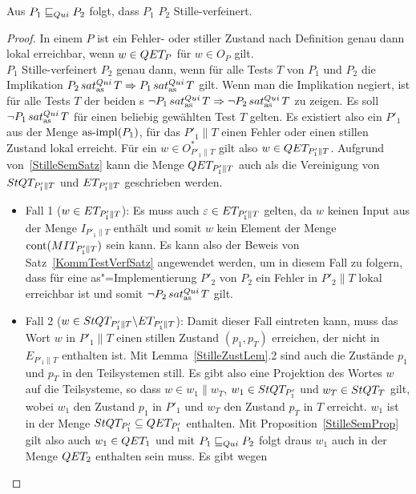 \begin{Satz}
  \label{StilleTestVerfSatz}
  Aus $P_1 \sqsubseteq  _{Qui} P_2$ folgt, dass $P_1$ $P_2$ Stille-verfeinert.
\end{Satz}
\begin{proof}
  In einem \MEIO{} $P$ ist ein Fehler- oder stiller Zustand nach Definition
  genau dann lokal erreichbar, wenn $w\in QET _P$ für $w\in O_P$ gilt.\\
  $P_1$ Stille-verfeinert $P_2$ genau dann, wenn für alle Tests $T$ von $P_1$
  und $P_2$ die Implikation $P_2\hspace{0.05cm}sat_\mathrm{as}^{Qui}\hspace{0.05cm} T \Rightarrow P_1\hspace{0.05cm}sat_\mathrm{as}^{Qui}\hspace{0.05cm} T$ gilt. Wenn
  man die Implikation negiert, ist für alle Tests $T$ der beiden \MEIO{}s $\neg
  P_1\hspace{0.05cm}sat_\mathrm{as}^{Qui}\hspace{0.05cm} T \Rightarrow \neg P_2\hspace{0.05cm}sat_\mathrm{as}^{Qui}\hspace{0.05cm} T$ zu zeigen. Es soll $\neg P_1
  \hspace{0.05cm}sat_\mathrm{as}^{Qui}\hspace{0.05cm} T$ für einen beliebig gewählten Test $T$ gelten. Es existiert also
  ein $P'_1$ aus der Menge $\mathrm{as}\text{-}\mathrm{impl} (P_1)$, für das $P'_1\|T$ einen Fehler oder
  einen stillen Zustand lokal erreicht. Für ein $w\in O_{P'_1\|T}^*$ gilt also
  $w\in QET _{P'_1\|T}$. Aufgrund von~\ref{StilleSemSatz} kann die Menge $QET
  _{P'_1\|T}$ auch als die Vereinigung von $StQT _{P'_1\|T}$ und $ET
  _{P'_1\|T}$ geschrieben werden.
  \begin{itemize}
    \item Fall 1 ($w\in ET _{P'_1\|T}$): Es muss auch $\varepsilon\in ET
      _{P'_1\|T}$ gelten, da $w$ keinen Input aus der Menge $I _{P'_1\|T}$
      enthält und somit $w$ kein Element der Menge $\mathrm{cont} (MIT _{P'_1\|T})$
      sein kann. Es kann also der Beweis von Satz~\ref{KommTestVerfSatz}
      angewendet werden, um in diesem Fall zu folgern, dass für eine
      as"=Implementierung $P'_2$ von $P_2$ ein Fehler in $P'_2\|T$ lokal
      erreichbar ist und somit $\neg P_2\hspace{0.05cm}sat_\mathrm{as}^{Qui}\hspace{0.05cm} T$ gilt.
    \item Fall 2 ($w\in StQT _{P'_1\|T}\backslash ET _{P'_1\|T}$): Damit dieser
      Fall eintreten kann, muss das Wort $w$ in $P'_1\|T$ einen stillen
      Zustand $(p_1,p_T)$ erreichen, der nicht in $E_{P'_1\|T}$ enthalten ist.
      Mit Lemma~\ref{StilleZustLem}.2 sind auch die Zustände $p_1$ und $p_T$ in
      den Teilsystemen still. Es gibt also eine Projektion des Wortes $w$ auf
      die Teilsysteme, so dass $w\in w_1\|w_T$, $w_1\in StQT _{P'_1}$ und
      $w_T\in StQT _T$ gilt, wobei $w_1$ den Zustand $p_1$ in $P'_1$ und $w_T$
      den Zustand $p_T$ in $T$ erreicht. $w_1$ ist in der Menge $StQT _{P'_1}
      \subseteq QET _{P'_1}$ enthalten. Mit Proposition~\ref{StilleSemProp}
      gilt also auch $w_1\in QET _1$ und mit $P_1 \sqsubseteq  _{Qui} P_2$ folgt draus
      $w_1$ auch in der Menge $QET _2$ enthalten sein muss. Es gibt wegen

\end{itemize}
\end{proof}
